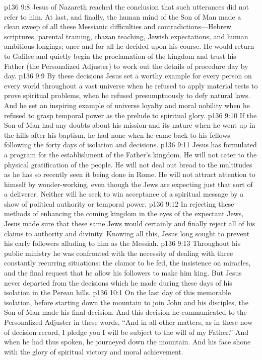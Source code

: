 \vs p136 9:8 Jesus of Nazareth reached the conclusion that such utterances did not refer to him. At last, and finally, the human mind of the Son of Man made a clean sweep of all these Messianic difficulties and contradictions---Hebrew scriptures, parental training, chazan teaching, Jewish expectations, and human ambitious longings; once and for all he decided upon his course. He would return to Galilee and quietly begin the proclamation of the kingdom and trust his Father (the Personalized Adjuster) to work out the details of procedure day by day.
\pc \vs p136 9:9 By these decisions Jesus set a worthy example for every person on every world throughout a vast universe when he refused to apply material tests to prove spiritual problems, when he refused presumptuously to defy natural laws. And he set an inspiring example of universe loyalty and moral nobility when he refused to grasp temporal power as the prelude to spiritual glory.
\pc \vs p136 9:10 If the Son of Man had any doubts about his mission and its nature when he went up in the hills after his baptism, he had none when he came back to his fellows following the forty days of isolation and decisions.
\vs p136 9:11 Jesus has formulated a program for the establishment of the Father’s kingdom. He will not cater to the physical gratification of the people. He will not deal out bread to the multitudes as he has so recently seen it being done in Rome. He will not attract attention to himself by wonder\hyp{}working, even though the Jews are expecting just that sort of a deliverer. Neither will he seek to win acceptance of a spiritual message by a show of political authority or temporal power.\plusone
\vs p136 9:12 In rejecting these methods of enhancing the coming kingdom in the eyes of the expectant Jews, Jesus made sure that these same Jews would certainly and finally reject all of his claims to authority and divinity. Knowing all this, Jesus long sought to prevent his early followers alluding to him as the Messiah.
\vs p136 9:13 Throughout his public ministry he was confronted with the necessity of dealing with three constantly recurring situations: the clamor to be fed, the insistence on miracles, and the final request that he allow his followers to make him king. But Jesus never departed from the decisions which he made during these days of his isolation in the Perean hills.
\vs p136 10:1 On the last day of this memorable isolation, before starting down the mountain to join John and his disciples, the Son of Man made his final decision. And this decision he communicated to the Personalized Adjuster in these words, \textcolor{ubdarkred}{“And in all other matters, as in these now of decision\hyp{}record, I pledge you I will be subject to the will of my Father.”} And when he had thus spoken, he journeyed down the mountain. And his face shone with the glory of spiritual victory and moral achievement.

